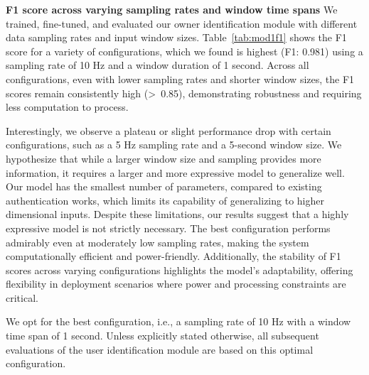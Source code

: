\noindent\textbf{F1 score across varying sampling rates and window time spans} We trained, fine-tuned, and evaluated our owner identification module with different data sampling rates and input window sizes. Table~\ref{tab:mod1f1} shows the F1 score for a variety of configurations, which we found is highest (F1: 0.981) using a sampling rate of 10 Hz and a window duration of 1 second. Across all configurations, even with lower sampling rates and shorter window sizes, the F1 scores remain consistently high (>~0.85), demonstrating robustness and requiring less computation to process. 

Interestingly, we observe a plateau or slight performance drop with certain configurations, such as a 5 Hz sampling rate and a 5-second window size. We hypothesize that while a larger window size and sampling provides more information, it requires a larger and more expressive model to generalize well. Our model has the smallest number of parameters, compared to existing authentication works, which limits its capability of generalizing to higher dimensional inputs. Despite these limitations, our results suggest that a highly expressive model is not strictly necessary. The best configuration performs admirably even at moderately low sampling rates, making the system computationally efficient and power-friendly. Additionally, the stability of F1 scores across varying configurations highlights the model's adaptability, offering flexibility in deployment scenarios where power and processing constraints are critical.

We opt for the best configuration, i.e., a sampling rate of 10 Hz with a window time span of 1 second. Unless explicitly stated otherwise, all subsequent evaluations of the user identification module are based on this optimal configuration.

\begin{comment}
As shown in Figure \ref{fig:f1score} and \ref{fig:auc}, both F1 score and AUC are highest (F1 score: 0.93 and AUC: 0.96)
     when we use the model with sampling rate of 1 and 
    one second window, namely a single timestamp data analysis. Noticeably, for models running at frequencies of {1, 2} Hz, and with window size of {1, 2} seconds,
    we can get the satisfactory F1 scores and AUCs. This suggests that our model is capable of authenticating user
    in using low sampling rate and short window, which is helpful in reducing the computation time and workload.
     Generally, as the frequency and window size get larger, there is a drop
    in both F1 score and AUC. This may be due to the underfitting of the model since we adopt a relatively computationally-
    friendly model and only trained for \Le~epochs for quick training, so when the complexity of the input data increases, it would
    be more difficult for the model to learn the legitimate user's behavior pattern.
\end{comment}
    
